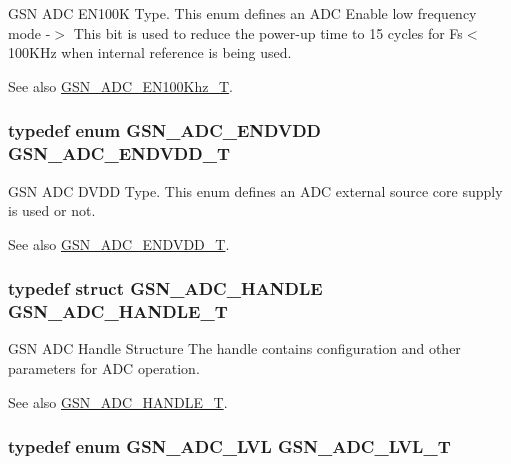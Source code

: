 GSN ADC EN100K Type. This enum defines an ADC Enable low frequency mode -\/$>$ This bit is used to reduce the power-\/up time to 15 cycles for Fs$<$100KHz when internal reference is being used. 

\begin{DoxySeeAlso}{See also}
\hyperlink{a00643_gacdca24ad9324635589139ad12ce67090}{GSN\_\-ADC\_\-EN100Khz\_\-T}. 
\end{DoxySeeAlso}
\hypertarget{a00643_ga704b8e4a05f99219d70f32cbf2fb4ca5}{
\subsubsection[{GSN\_\-ADC\_\-ENDVDD\_\-T}]{\setlength{\rightskip}{0pt plus 5cm}typedef enum {\bf GSN\_\-ADC\_\-ENDVDD}  {\bf GSN\_\-ADC\_\-ENDVDD\_\-T}}}
\label{a00643_ga704b8e4a05f99219d70f32cbf2fb4ca5}


GSN ADC DVDD Type. This enum defines an ADC external source core supply is used or not. 

\begin{DoxySeeAlso}{See also}
\hyperlink{a00643_ga704b8e4a05f99219d70f32cbf2fb4ca5}{GSN\_\-ADC\_\-ENDVDD\_\-T}. 
\end{DoxySeeAlso}
\hypertarget{a00643_gac0da2e000e8dd65d554e2edf7cca8330}{
\subsubsection[{GSN\_\-ADC\_\-HANDLE\_\-T}]{\setlength{\rightskip}{0pt plus 5cm}typedef struct {\bf GSN\_\-ADC\_\-HANDLE} {\bf GSN\_\-ADC\_\-HANDLE\_\-T}}}
\label{a00643_gac0da2e000e8dd65d554e2edf7cca8330}


GSN ADC Handle Structure The handle contains configuration and other parameters for ADC operation. 

\begin{DoxySeeAlso}{See also}
\hyperlink{a00643_gac0da2e000e8dd65d554e2edf7cca8330}{GSN\_\-ADC\_\-HANDLE\_\-T}. 
\end{DoxySeeAlso}
\hypertarget{a00643_ga5a94fb4298f40809bab65da9dd446da7}{
\subsubsection[{GSN\_\-ADC\_\-LVL\_\-T}]{\setlength{\rightskip}{0pt plus 5cm}typedef enum {\bf GSN\_\-ADC\_\-LVL}  {\bf GSN\_\-ADC\_\-LVL\_\-T}}}
\label{a00643_ga5a94fb4298f40809bab65da9dd446da7}


